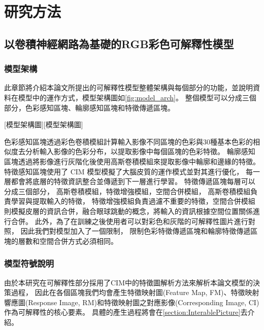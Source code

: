 \documentclass[class=NCU_thesis, crop=false]{standalone}
\begin{document}
\chapter{研究方法}

\section{以卷積神經網路為基礎的RGB彩色可解釋性模型}
\subsection{模型架構}

此章節將介紹本論文所提出的可解釋性模型整體架構與每個部分的功能，並說明資料在模型中的運作方式，模型架構圖如\cref{fig:model_arch}。
整個模型可以分成三個部分，色彩感知區塊、輪廓感知區塊和特徵傳遞區塊。

[模型架構圖][模型架構圖]

\pagebreak

色彩感知區塊透過彩色卷積模組計算輸入影像不同區塊的色彩與30種基本色彩的相似度去分析輸入影像的色彩分布，以提取影像中每個區塊的色彩特徵。
輪廓感知區塊透過將影像進行灰階化後使用高斯卷積模組來提取影像中輪廓和邊緣的特徵。
特徵感知區塊使用了 CIM 模型模擬了大腦皮質的運作模式並對其進行優化，
每一層都會將底層的特徵資訊整合並傳遞到下一層進行學習。 
特徵傳遞區塊每層可以分成三個部分，
高斯卷積模組，特徵增強模組，空間合併模組，
高斯卷積模組負責學習與提取輸入的特徵，
特徵增強模組負責過濾不重要的特徵，空間合併模組則模擬皮層的資訊合併，融合眼球跳動的概念，將輸入的資訊根據空間位置關係進行合併。
此外，為了在訓練之後使用者可以對彩色和灰階的可解釋性圖片進行對照，
因此我們對模型加入了一個限制，
限制色彩特徵傳遞區塊和輪廓特徵傳遞區塊的層數和空間合併方式必須相同。
\pagebreak
\subsection{模型符號說明}
	由於本研究在可解釋性部分採用了CIM中的特徵圖解析方法來解析本論文模型的決策過程，
	因此在各個區塊我們均會產生特徵映射圖(Feature Map, FM)、特徵映射響應圖(Response Image, RM)和特徵映射圖之對應影像(Corresponding Image, CI)作為可解釋性的核心要素。
	具體的產生過程將會在\cref{section:InterablePicture}去介紹。
\end{document}
